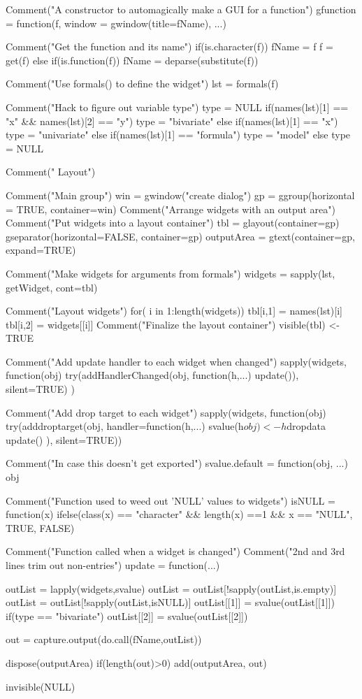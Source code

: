 \documentclass[12pt]{article}
\begin{document}
\begin{Scode}
  Comment("A constructor to automagically make a GUI for a function")
  gfunction = function(f, window = gwindow(title=fName), ...) {

    Comment("Get the function and its name")
    if(is.character(f)) {
      fName = f
      f = get(f)
    } else if(is.function(f)) {
      fName = deparse(substitute(f))
    }
    
    Comment("Use formals() to define the widget")
    lst = formals(f)



    Comment("Hack to figure out variable type")
    type = NULL
    if(names(lst)[1] == "x" && names(lst)[2] == "y") {
      type = "bivariate"
    } else if(names(lst)[1] == "x") {
      type = "univariate"
    } else if(names(lst)[1] == "formula") {
      type = "model"
    } else {
      type = NULL
    }


    Comment(" Layout")

    Comment("Main group")
    win = gwindow("create dialog")
    gp = ggroup(horizontal = TRUE, container=win)
    Comment("Arrange widgets with an output area")
    Comment("Put widgets into a layout container")
    tbl = glayout(container=gp)
    gseparator(horizontal=FALSE, container=gp)
    outputArea = gtext(container=gp, expand=TRUE)


    Comment("Make widgets for arguments from formals")
    widgets = sapply(lst, getWidget, cont=tbl)

    Comment("Layout widgets")
    for( i in 1:length(widgets)) {
      tbl[i,1] = names(lst)[i]
      tbl[i,2] = widgets[[i]]
    }
    Comment("Finalize the layout container")
    visible(tbl) <- TRUE


    Comment("Add update handler to each widget when changed")
    sapply(widgets, function(obj) {
      try(addHandlerChanged(obj, function(h,...) update()), silent=TRUE)
    })

    Comment("Add drop target to each widget")
    sapply(widgets, function(obj)
    try(adddroptarget(obj,
    handler=function(h,...) {
      svalue(h$obj) <- h$dropdata
      update()
    }),
    silent=TRUE))



    Comment("In case this doesn't get exported")
    svalue.default = function(obj, ...) obj

    Comment("Function used to weed out 'NULL' values to widgets")
    isNULL = function(x) 
      ifelse(class(x) == "character" && length(x) ==1 && x == "NULL",
        TRUE, FALSE)

    Comment("Function called when a widget is changed")
    Comment("2nd and 3rd lines trim out non-entries")
    update = function(...) {
      outList = lapply(widgets,svalue)
      outList = outList[!sapply(outList,is.empty)]
      outList = outList[!sapply(outList,isNULL)]
      outList[[1]] = svalue(outList[[1]])
      if(type == "bivariate")
      outList[[2]] = svalue(outList[[2]])

      out = capture.output(do.call(fName,outList))
    
      dispose(outputArea)
      if(length(out)>0)
      add(outputArea, out)
    }
    invisible(NULL)
  }
\end{Scode}
\end{document}

